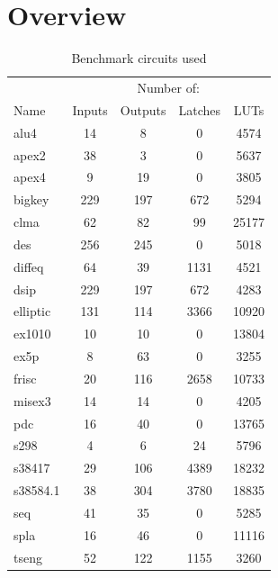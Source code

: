 \documentclass[12pt,final,oneside]{dwThesis} %
\begin{document}
\section{Overview}
\begin{table}
    \begin{center}
        \begin{tabular}{lcccc}
        \toprule
         & \multicolumn{4}{c}{Number of:}\\
         \cmidrule{2-5}
         Name & Inputs & Outputs & Latches & \acp{LUT}\\
         \midrule
            alu4 & 14 & 8 & 0 & 4574\\
            apex2 & 38 & 3 & 0 & 5637\\
            apex4 & 9 & 19 & 0 & 3805\\
            bigkey & 229 & 197 & 672 & 5294\\
            clma & 62 & 82 & 99 & 25177\\
            des & 256 & 245 & 0 & 5018\\
            diffeq & 64 & 39 & 1131 & 4521\\
            dsip & 229 & 197 & 672 & 4283\\
            elliptic & 131 & 114 & 3366 & 10920\\
            ex1010 & 10 & 10 & 0 & 13804\\
            ex5p & 8 & 63 & 0 & 3255\\
            frisc & 20 & 116 & 2658 & 10733\\
            misex3 & 14 & 14 & 0 & 4205\\
            pdc & 16 & 40 & 0 & 13765\\
            s298     & 4 & 6 & 24 & 5796\\
            s38417   & 29 & 106 & 4389 & 18232\\
            s38584.1 & 38 & 304 & 3780 & 18835\\
            seq      & 41 & 35 & 0 & 5285\\
            spla     & 16 & 46 & 0 & 11116\\
            tseng    & 52 & 122 & 1155 & 3260\\
            \bottomrule
        \end{tabular}
        \caption{Benchmark circuits used}
        \label{benchmarkList}
    \end{center}
\end{table}
\end{document}
